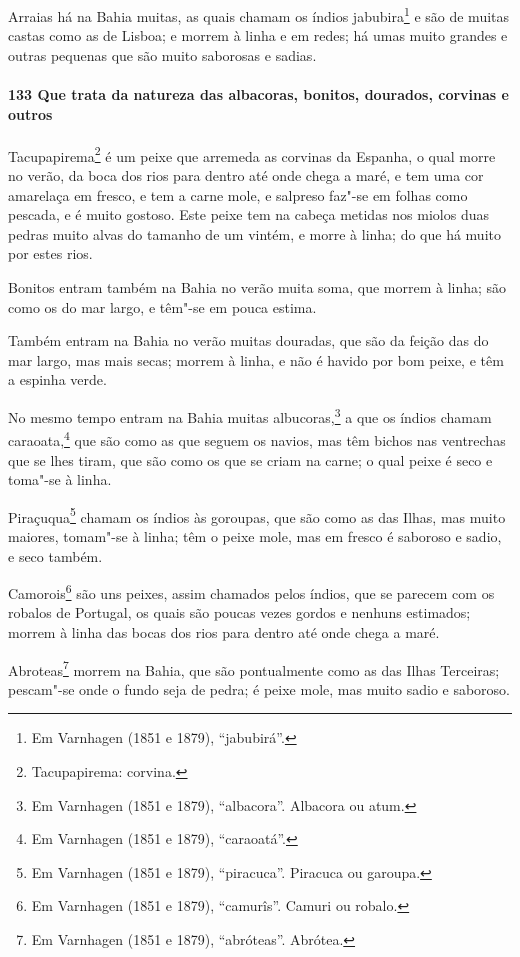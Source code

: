\begin{linenumbers}
Arraias há na Bahia muitas, as quais chamam os índios jabubira\footnote{ Em Varnhagen
(1851 e 1879), ``jabubirá''.} e são de muitas castas como as de Lisboa; e morrem à linha e
em redes; há umas muito grandes e outras pequenas que são muito saborosas e sadias.

\paragraph{133 Que trata da natureza das albacoras, bonitos, dourados, corvinas e outros}\quad
Tacupapirema\footnote{ Tacupapirema: corvina.} é um peixe que arremeda as corvinas da
Espanha, o qual morre no verão, da boca dos rios para dentro até onde chega a maré, e tem
uma cor amarelaça em fresco, e tem a carne mole, e salpreso faz"-se em folhas como pescada,
e é muito gostoso. Este peixe tem na cabeça metidas nos miolos duas pedras muito alvas do
tamanho de um vintém, e morre à linha; do que há muito por estes rios.

Bonitos entram também na Bahia no verão muita soma, que morrem à linha; são como os do mar
largo, e têm"-se em pouca estima.

Também entram na Bahia no verão muitas douradas, que são da feição das do mar largo, mas
mais secas; morrem à linha, e não é havido por bom peixe, e têm a espinha verde.

No mesmo tempo entram na Bahia muitas albucoras,\footnote{ Em Varnhagen (1851 e 1879),
``albacora''. Albacora ou atum.} a que os índios chamam caraoata,\footnote{ Em Varnhagen
(1851 e 1879), ``caraoatá''.} que são como as que seguem os navios, mas têm bichos nas
ventrechas que se lhes tiram, que são como os que se criam na carne; o qual peixe é seco e
toma"-se à linha.

Piraçuqua\footnote{ Em Varnhagen (1851 e 1879), ``piracuca''. Piracuca ou garoupa.} chamam
os índios às goroupas, que são como as das Ilhas, mas muito maiores, tomam"-se à linha; têm
o peixe mole, mas em fresco é saboroso e sadio, e seco também.

Camorois\footnote{ Em Varnhagen (1851 e 1879), ``camurîs''. Camuri ou robalo.} são uns
peixes, assim chamados pelos índios, que se parecem com os robalos de Portugal, os quais
são poucas vezes gordos e nenhuns estimados; morrem à linha das bocas dos rios para dentro
até onde chega a maré.

Abroteas\footnote{ Em Varnhagen (1851 e 1879), ``abróteas''. Abrótea.} morrem na Bahia,
que são pontualmente como as das Ilhas Terceiras; pescam"-se onde o fundo seja de pedra; é
peixe mole, mas muito sadio e saboroso.


\end{linenumbers}
